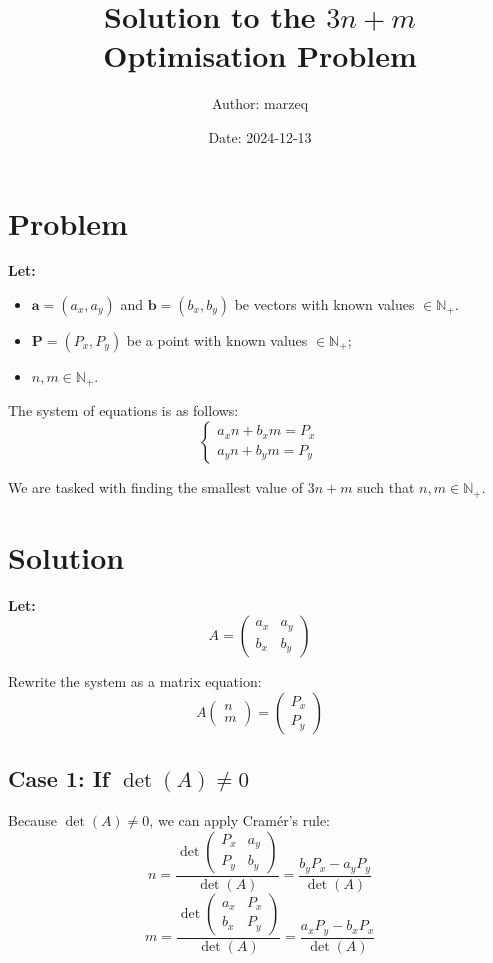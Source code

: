 \documentclass{article}
\title{Solution to the \(3n + m\) Optimisation Problem}
\author{Author: marzeq}
\date{Date: 2024-12-13}
\newcommand{\intpos}{\mathbb{N}_+}
\begin{document}
\maketitle

\section*{Problem}

\textbf{Let:}
\begin{itemize}
  \item \( \mathbf{a} = (a_x, a_y) \) and \( \mathbf{b} = (b_x, b_y) \) be vectors with known values \( \in \intpos \).
  \item \( \mathbf{P} = (P_x, P_y) \) be a point with known values \( \in \intpos \);
  \item \( n,m \in \intpos \).
\end{itemize}

The system of equations is as follows:
\[
  \begin{cases}
  a_xn + b_xm = P_x \\
  a_yn + b_ym = P_y
  \end{cases}
\]

We are tasked with finding the smallest value of \( 3n + m \) such that \( n, m \in \intpos \).

\section*{Solution}

\textbf{Let:}
  \[
  A = \begin{pmatrix}
  a_x & a_y \\
  b_x & b_y
  \end{pmatrix}
\]

Rewrite the system as a matrix equation:
\[
  A \begin{pmatrix}
  n \\
  m
  \end{pmatrix}
  = \begin{pmatrix}
  P_x \\
  P_y
  \end{pmatrix}
\]

\subsection*{Case 1: If \( \det(A) \neq 0 \)}

Because \( \det(A) \neq 0 \), we can apply Cramér's rule:
\[
  n = \frac{\det\begin{pmatrix} P_x & a_y \\ P_y & b_y \end{pmatrix}}{\det(A)} = \frac{b_yP_x - a_yP_y}{\det(A)}
\]
\[
  m = \frac{\det\begin{pmatrix} a_x & P_x \\ b_x & P_y \end{pmatrix}}{\det(A)} = \frac{a_xP_y - b_xP_x}{\det(A)}
\]
\end{document}

